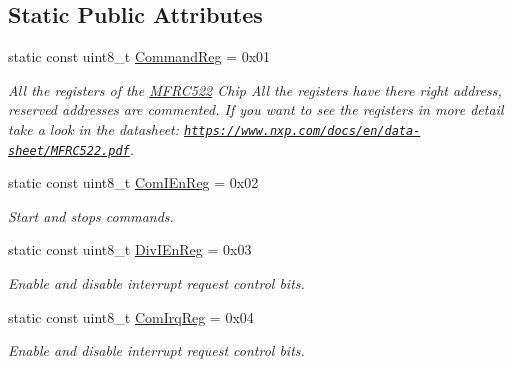 \subsection*{Static Public Attributes}
\begin{DoxyCompactItemize}
\item 
\mbox{\label{classMFRC522_a0b1c450a48fb3276a360c0a27bb93542}} 
static const uint8\+\_\+t \hyperlink{classMFRC522_a0b1c450a48fb3276a360c0a27bb93542}{Command\+Reg} = 0x01
\begin{DoxyCompactList}\small\item\em All the registers of the \hyperlink{classMFRC522}{M\+F\+R\+C522} Chip  All the registers have there right address, reserved addresses are commented. If you want to see the registers in more detail take a look in the datasheet\+: \href{https://www.nxp.com/docs/en/data-sheet/MFRC522.pdf}{\tt https\+://www.\+nxp.\+com/docs/en/data-\/sheet/\+M\+F\+R\+C522.\+pdf}. \end{DoxyCompactList}\item 
\mbox{\label{classMFRC522_a76de8291c84f20fe04af16463faffdac}} 
static const uint8\+\_\+t \hyperlink{classMFRC522_a76de8291c84f20fe04af16463faffdac}{Com\+I\+En\+Reg} = 0x02
\begin{DoxyCompactList}\small\item\em Start and stops commands. \end{DoxyCompactList}\item 
\mbox{\label{classMFRC522_abe05fe9fcedbb34cde4ef0f09c7373db}} 
static const uint8\+\_\+t \hyperlink{classMFRC522_abe05fe9fcedbb34cde4ef0f09c7373db}{Div\+I\+En\+Reg} = 0x03
\begin{DoxyCompactList}\small\item\em Enable and disable interrupt request control bits. \end{DoxyCompactList}\item 
\mbox{\label{classMFRC522_a5bb072accfc1422669f46aec2daddc08}} 
static const uint8\+\_\+t \hyperlink{classMFRC522_a5bb072accfc1422669f46aec2daddc08}{Com\+Irq\+Reg} = 0x04
\begin{DoxyCompactList}\small\item\em Enable and disable interrupt request control bits. \end{DoxyCompactList}\item 

\end{DoxyCompactItemize}

